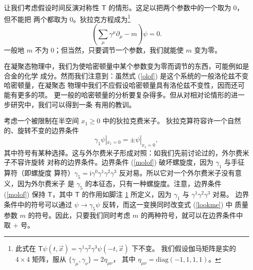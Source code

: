 \documentclass[11pt,a4paper]{article}
\numberwithin{equation}{section}
\def\sT{{\mathsf T}}
\def\g{\gamma}
\def\i{\mathrm i}
\def\be{\begin{equation}}
\def\ee{\end{equation}}
\begin{document}
让我们考虑假设时间反演对称性 $\sT$ 的情形。这足以把两个参数中的一个取为 0，但不能把
两个都取为 0。狄拉克方程成为\footnote{\label{memo}
此式在 $\sT\psi(t,\vec x)=\g^1\g^2\g^3\psi(-t,\vec x)$ 下不变。
我们假设伽马矩阵是实的 $4\times 4$ 矩阵，服从 $\{\g_\mu,\g_\nu\}=2\eta_{\mu\nu}$，
其中 $\eta_{\mu\nu}=\mathrm{diag}(-1,1,1,1)$。}
\be\label{lookme}\left(\sum_\mu\gamma^\mu\partial_\mu -m\right)\psi=0.\ee
 一般地 $m$ 不为 0；但当然，只要调节一个参数，我们就能使 $m$ 变为零。
  
  在凝聚态物理中，我们为使哈密顿量中某个参数变为零而调节的东西，可能例如是合金的化学
成分。然而我们注意到：虽然式 (\ref{olof}) 是这个系统的一般洛伦兹不变哈密顿量，在凝聚态
物理中我们不应假设哈密顿量具有洛伦兹不变性，因而还可能有更多的项。
更一般的哈密顿量的分析要复杂得多。但从对相对论情形的进一步研究中，我们可以得到一条
有用的教训。
  
考虑一个被限制在半空间 $x_1\geq 0$ 中的狄拉克费米子。
狄拉克算符容许一个自然的、旋转不变的边界条件
\be\label{molof}\g_1\psi|_{x_1=0}=\pm \psi|_{x_1=0},\ee
其中符号有某种选择。这与外尔费米子形成对照：如我们先前讨论过的，外尔费米子不容许旋转
对称的边界条件。边界条件 (\ref{molof}) 破坏螺旋度，因为 $\g_1$ 与手征算符（即螺旋度
算符）$\g_5=\i\g^0\g^1\g^2\g^3$ 反对易。所以它对一个外尔费米子没有意义，因为外尔费米子
是 $\g_5$ 的本征态，只有一种螺旋度。注意，边界条件 (\ref{molof}) 保持 $\sT$，其中 $\sT$
的作用如脚注 \ref{memo} 所定义，因为 $\g_1$ 与 $\g^1\g^2\g^3$ 对易。
边界条件中的符号可以通过 $\psi\to\g_5 \psi$ 反转，而这一变换同时改变式 (\ref{lookme}) 中
质量参数 $m$ 的符号。因此，只要我们同时考虑 $m$ 的两种符号，就可以在边界条件中取 $+$ 号。

\end{document}
